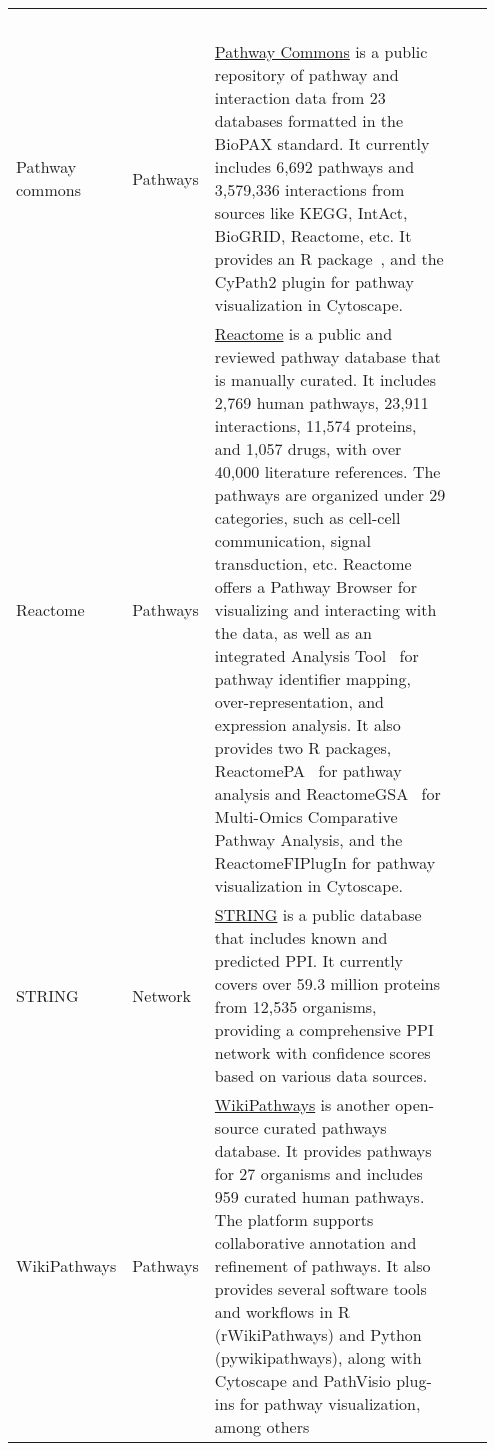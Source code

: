 \begin{newpdflayout}{210mm}{297mm}
\begin{longtable}{@{} 
  p{0.10\linewidth}@{\hspace{6pt}} 
  p{0.08\linewidth}@{\hspace{6pt}} 
  p{0.69\linewidth}@{\hspace{6pt}} 
  p{0.08\linewidth} 
@{}}
  ~\cite{RN91} \\
Pathway commons  & Pathways &
  \href{https://www.pathwaycommons.org/}{Pathway Commons} is a public repository of pathway and interaction data from 23 databases formatted in the BioPAX standard. It currently includes 6,692 pathways and 3,579,336 interactions from sources like KEGG, IntAct, BioGRID, Reactome, etc. It provides an R package~\cite{RN151}, and the CyPath2 plugin for pathway visualization in Cytoscape. &
  ~\cite{RN142} \\
Reactome & Pathways &
  \href{https://reactome.org/}{Reactome} is a public and reviewed pathway database that is manually curated. It includes 2,769 human pathways, 23,911 interactions, 11,574 proteins, and 1,057 drugs, with over 40,000 literature references. The pathways are organized under 29 categories, such as cell-cell communication, signal transduction, etc. Reactome offers a Pathway Browser for visualizing and interacting with the data, as well as an integrated Analysis Tool~\cite{RN150} for pathway identifier mapping, over-representation, and expression analysis. It also provides two R packages, ReactomePA~\cite{RN148} for pathway analysis and ReactomeGSA~\cite{RN149} for Multi-Omics Comparative Pathway Analysis, and the ReactomeFIPlugIn for pathway visualization in Cytoscape. &
  ~\cite{RN150} \\
STRING & Network & 
  \href{https://string-db.org/}{STRING} is a public database that includes known and predicted \gls{PPI}. It currently covers over 59.3 million proteins from 12,535 organisms, providing a comprehensive \gls{PPI} network with confidence scores based on various data sources. &
  ~\cite{RN72} \\
WikiPathways & Pathways &
  \href{https://www.wikipathways.org/}{WikiPathways} is another open-source curated pathways database. It provides pathways for 27 organisms and includes 959 curated human pathways. The platform supports collaborative annotation and refinement of pathways. It also provides several software tools and workflows in R (rWikiPathways) and Python (pywikipathways), along with Cytoscape and PathVisio plug-ins for pathway visualization, among others~\cite{RN147} &
  ~\cite{RN144} \\
\end{longtable}

\end{newpdflayout}


